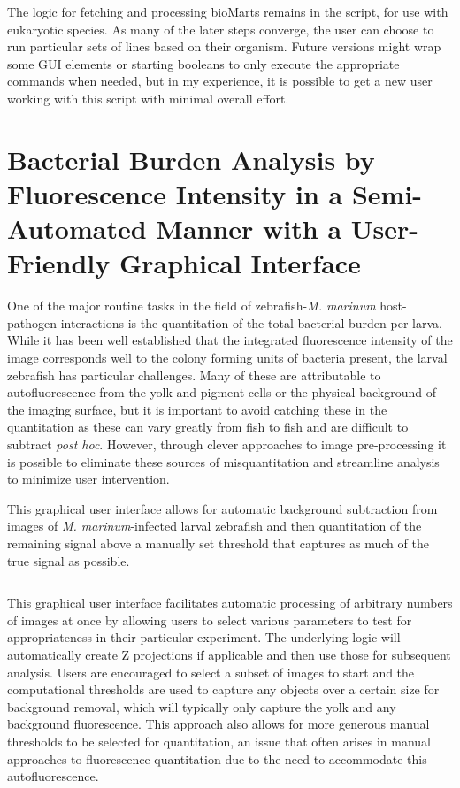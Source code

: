 The logic for fetching and processing bioMarts remains in the script, for use with eukaryotic species. As many of the later steps converge, the user can choose to run particular sets of lines based on their organism. Future versions might wrap some GUI elements or starting booleans to only execute the appropriate commands when needed, but in my experience, it is possible to get a new user working with this script with minimal overall effort.

\section{Bacterial Burden Analysis by Fluorescence Intensity in a Semi-Automated Manner with a User-Friendly Graphical Interface}

One of the major routine tasks in the field of zebrafish-\textit{M. marinum} host-pathogen interactions is the quantitation of the total bacterial burden per larva. While it has been well established that the integrated fluorescence intensity of the image corresponds well to the colony forming units of bacteria present, the larval zebrafish has particular challenges. Many of these are attributable to autofluorescence from the yolk and pigment cells or the physical background of the imaging surface, but it is important to avoid catching these in the quantitation as these can vary greatly from fish to fish and are difficult to subtract \textit{post hoc}. However, through clever approaches to image pre-processing it is possible to eliminate these sources of misquantitation and streamline analysis to minimize user intervention.

\begin{code}
\caption{This graphical user interface allows for automatic background subtraction from images of \textit{M. marinum}-infected larval zebrafish and then quantitation of the remaining signal above a manually set threshold that captures as much of the true signal as possible.}
\label{burden}

\inputminted[breaklines,frame=single,fontsize=\small]{python}{source/burdenMeasurer.py}

\end{code}

This graphical user interface facilitates automatic processing of arbitrary numbers of images at once by allowing users to select various parameters to test for appropriateness in their particular experiment. The underlying logic will automatically create Z projections if applicable and then use those for subsequent analysis. Users are encouraged to select a subset of images to start and the computational thresholds are used to capture any objects over a certain size for background removal, which will typically only capture the yolk and any background fluorescence. This approach also allows for more generous manual thresholds to be selected for quantitation, an issue that often arises in manual approaches to fluorescence quantitation due to the need to accommodate this autofluorescence. 

